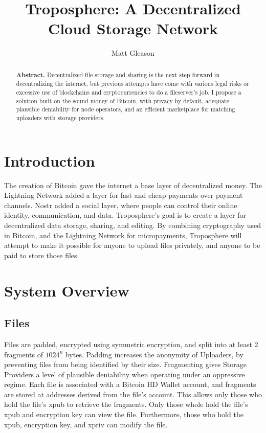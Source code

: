 \documentclass[12pt]{article}
\title{Troposphere: A Decentralized Cloud Storage Network}
\author{Matt Gleason}
\date{}
\begin{document}
\maketitle

\begin{abstract}\noindent \textbf{Abstract.} Decentralized file storage and sharing is the next step forward in decentralizing the internet, but previous attempts have come with various legal risks or excessive use of blockchains and cryptocurrencies to do a fileserver's job. I propose a solution built on the sound money of Bitcoin, with privacy by default, adequate plausible deniability for node operators, and an efficient marketplace for matching uploaders with storage providers.
\end{abstract}

\section{Introduction}

The creation of Bitcoin gave the internet a base layer of decentralized money. The Lightning Network added a layer for fast and cheap payments over payment channels. Nostr added a social layer, where people can control their online identity, communication, and data. Troposphere's goal is to create a layer for decentralized data storage, sharing, and editing. By combining cryptography used in Bitcoin, and the Lightning Network for micropayments, Troposphere will attempt to make it possible for anyone to upload files privately, and anyone to be paid to store those files.

\section{System Overview}

\subsection{Files}

Files are padded, encrypted using symmetric encryption, and split into at least 2 fragments of $1024^n$ bytes. Padding increases the anonymity of Uploaders, by preventing files from being identified by their size. Fragmenting gives Storage Providers a level of plausible deniability when operating under an oppressive regime. Each file is associated with a Bitcoin HD Wallet account, and fragments are stored at addresses derived from the file's account. This allows only those who hold the file's xpub to retrieve the fragments. Only those whole hold the file's xpub and encryption key can view the file. Furthermore, those who hold the xpub, encryption key, and xpriv can modify the file.
\end{document}
